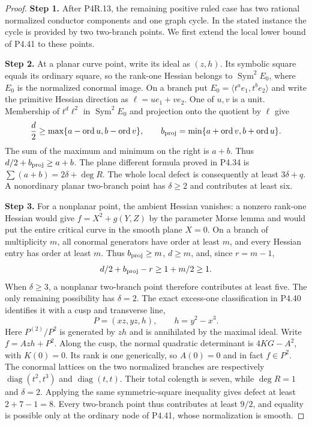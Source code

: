 \begin{proof}
\noindent\textbf{Step 1.} After P4R.13, the remaining positive ruled case has two
rational normalized conductor components and one graph
cycle. In the stated instance the cycle is provided by
two two-branch points. We first extend the local lower
bound of P4.41 to these points.

\noindent\textbf{Step 2.} At a planar curve point, write its ideal as $(z,h)$.
Its symbolic square equals its ordinary square, so the
rank-one Hessian belongs to $\operatorname{Sym}^2 E_0$,
where $E_0$ is the normalized conormal image. On a branch
put $E_0=\langle t^a e_1,t^b e_2\rangle$ and write the
primitive Hessian direction as $\ell=u e_1+v e_2$.
One of $u,v$ is a unit. Membership of
$t^d\ell^2$ in $\operatorname{Sym}^2E_0$ and projection
onto the quotient by $\ell$ give
\[
 \frac d2\ge\max\{a-\operatorname{ord}u,
                         b-\operatorname{ord}v\},\qquad
 b_{\rm proj}=\min\{a+\operatorname{ord}v,
                         b+\operatorname{ord}u\}.
\]
The sum of the maximum and minimum on the right is
$a+b$. Thus $d/2+b_{\rm proj}\ge a+b$.
The plane different formula proved in P4.34 is
$\sum(a+b)=2\delta+\deg R$. The whole local defect
is consequently at least $3\delta+q$.
A nonordinary planar two-branch point has $\delta\ge2$
and contributes at least six.

\noindent\textbf{Step 3.} For a nonplanar point, the ambient Hessian vanishes: a
nonzero rank-one Hessian would give $f=X^2+g(Y,Z)$ by
the parameter Morse lemma and would put the entire
critical curve in the smooth plane $X=0$.
On a branch of multiplicity $m$, all conormal generators
have order at least $m$, and every Hessian entry has
order at least $m$. Thus $b_{\rm proj}\ge m$, $d\ge m$,
and, since $r=m-1$,
\[
                  d/2+b_{\rm proj}-r\ge1+m/2\ge1.
\]
When $\delta\ge3$, a nonplanar two-branch point
therefore contributes at least five.
The only remaining possibility has $\delta=2$.
The exact excess-one classification in P4.40 identifies
it with a cusp and transverse line,
\[
                  P=(xz,yz,h),\qquad h=y^2-x^3.
\]
Here $P^{(2)}/P^2$ is generated by $zh$ and is
annihilated by the maximal ideal. Write $f=Azh+P^2$.
Along the cusp, the normal quadratic determinant is
$4KG-A^2$, with $K(0)=0$. Its rank is one generically,
so $A(0)=0$ and in fact $f\in P^2$.
The conormal lattices on the two normalized branches
are respectively $\operatorname{diag}(t^2,t^3)$ and
$\operatorname{diag}(t,t)$. Their total colength is seven,
while $\deg R=1$ and $\delta=2$.
Applying the same symmetric-square inequality gives
defect at least $2+7-1=8$.
Every two-branch point thus contributes at least $9/2$,
and equality is possible only at the ordinary node of
P4.41, whose normalization is smooth.


\end{proof}
